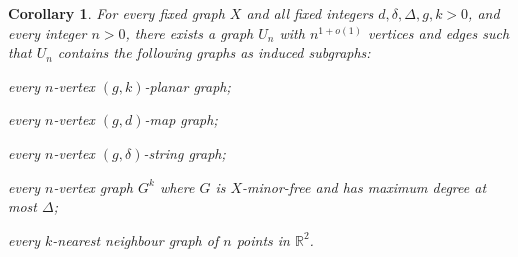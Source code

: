 \documentclass{patmorin}
\theoremstyle{plain}
\newtheorem{cor}[thm]{Corollary}
\theoremstyle{definition}
\newcommand{\R}{\mathbb{R}}
\begin{document}
\begin{cor}\label{universal_cor}
	\label{UniversalUniversal}
	For every fixed graph $X$ and all fixed integers $d,\delta,\Delta,g,k>0$, and every integer $n>0$, there exists a graph $U_n$ with $n^{1+o(1)}$ vertices and edges such that $U_n$ contains the following graphs as induced subgraphs:
	\begin{compactitem}
		\item every $n$-vertex $(g,k)$-planar graph;
		\item every $n$-vertex $(g,d)$-map graph;
		\item every $n$-vertex $(g,\delta)$-string graph;
		\item every $n$-vertex graph $G^k$ where $G$ is $X$-minor-free and has maximum degree at most $\Delta$;
		\item every $k$-nearest neighbour graph of $n$ points in $\R^2$.
	\end{compactitem}
\end{cor}
\end{document}
